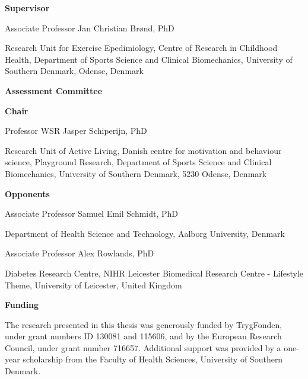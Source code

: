 \documentclass[
  9pt,
]{scrbook}
\author{}
\date{}
\begin{document}
  \frontmatter
  
  



\newpage

\textsf{\textbf{\Large{Supervisor}}}

\vspace*{\baselineskip}

Associate Professor Jan Christian Brønd, PhD

Research Unit for Exercise Epedimiology, Centre of Research in Childhood Health, Department of Sports Science and Clinical Biomechanics, University of Southern Denmark, Odense, Denmark

\vspace{2cm}

\textsf{\textbf{\Large{Assessment Committee}}}

\vspace*{\baselineskip}

\textbf{Chair}

Professor WSR Jasper Schiperijn, PhD

Research Unit of Active Living, Danish centre for motivation and behaviour science, Playground Research, Department of Sports Science and Clinical Biomechanics, University of Southern Denmark, 5230 Odense, Denmark

\bigskip

\textbf{Opponents}

\begin{multicols}{2}

Associate Professor Samuel Emil Schmidt, PhD

Department of Health Science and Technology, Aalborg University, Denmark

\columnbreak

Associate Professor Alex Rowlands, PhD

Diabetes Research Centre, NIHR Leicester Biomedical Research Centre - Lifestyle Theme, University of Leicester, United Kingdom

\end{multicols}

\vspace{2cm}

\textsf{\textbf{\Large{Funding}}}

\vspace*{\baselineskip}

The research presented in this thesis was generously funded by TrygFonden, under grant numbers ID 130081 and 115606, and by the European Research Council, under grant number 716657. Additional support was provided by a one-year scholarship from the Faculty of Health Sciences, University of Southern Denmark.
\end{document}
